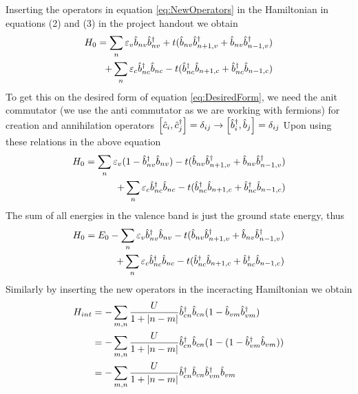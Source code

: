 \begin{solution}
 Inserting the operators in equation \eqref{eq:NewOperators} in the Hamiltonian in equations (2) and (3) in the project handout we obtain
 \begin{equation}
 \begin{split}
     H_0 = \sum_n \varepsilon_v \hat{b}_{nv} \hat{b}_{nv}^{\dagger} + t( \hat{b}_{nv} \hat{b}_{n+1,v}^{\dagger} + \hat{b}_{nv} \hat{b}_{n-1,v}^{\dagger}) & \\ + \sum_n \varepsilon_c \hat{b}_{nc}^{\dagger} \hat{b}_{nc} - t(\hat{b}_{nc}^{\dagger} \hat{b}_{n+1,c} + \hat{b}_{nc}^{\dagger} \hat{b}_{n-1,c}) &
     \end{split}
 \end{equation}
 To get this on the desired form of equation \ref{eq:DesiredForm}, we need the anit commutator (we use the anti commutator as we are working with fermions) for creation and annihilation operators $\comm{\anni{c}{i}}{\crea{c}{j}} = \delta_{ij} \rightarrow \comm{\crea{b}{i}}{\anni{b}{j}} = \delta_{ij}$
 Upon using these relations in the above equation
 \begin{equation}
      \begin{split}
     H_0 = \sum_n \varepsilon_v (1-\hat{b}_{nv}^{\dagger} \hat{b}_{nv}) - t(\hat{b}_{nv} \hat{b}_{n+1,v}^{\dagger} + \hat{b}_{nv} \hat{b}_{n-1,v}^{\dagger}) & \\ + \sum_n \varepsilon_c \hat{b}_{nc}^{\dagger} \hat{b}_{nc} - t(\hat{b}_{nc}^{\dagger} \hat{b}_{n+1,c} + \hat{b}_{nc}^{\dagger} \hat{b}_{n-1,c}) &
     \end{split}
 \end{equation}
 The sum of all energies in the valence band is just the ground state energy, thus
  \begin{equation}
      \begin{split}
     H_0 = E_0 - \sum_n \varepsilon_v \hat{b}_{nv}^{\dagger} \hat{b}_{nv} - t(\hat{b}_{nv} \hat{b}_{n+1,v}^{\dagger} + \hat{b}_{nv} \hat{b}_{n-1,v}^{\dagger}) & \\ + \sum_n \varepsilon_c \hat{b}_{nc}^{\dagger} \hat{b}_{nc} - t(\hat{b}_{nc}^{\dagger} \hat{b}_{n+1,c} + \hat{b}_{nc}^{\dagger} \hat{b}_{n-1,c}) &
     \end{split}
 \end{equation}
 Similarly by inserting the new operators in the inceracting Hamiltonian we obtain
 \begin{equation}
 \begin{split}
     H_{int} &= - \sum_{m,n} \frac{U}{1+\abs{n-m}} \hat{b}_{cn}^{\dagger} \hat{b}_{cn} (1- \hat{b}_{vm} \hat{b}_{vm}^{\dagger}) \\ &=  - \sum_{m,n} \frac{U}{1+\abs{n-m}} \hat{b}_{cn}^{\dagger} \hat{b}_{cn} (1- (1-\hat{b}_{vm}^{\dagger} \hat{b}_{vm})) \\&= - \sum_{m,n} \frac{U}{1+\abs{n-m}} \hat{b}_{cn}^{\dagger} \hat{b}_{cn} \hat{b}_{vm}^{\dagger} \hat{b}_{vm}
     \end{split}
 \end{equation}
\end{solution}


